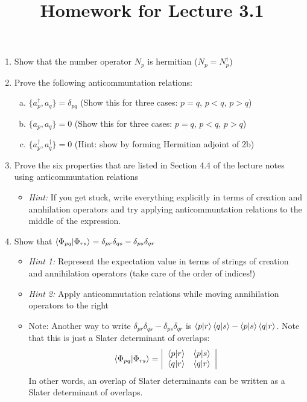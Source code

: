 \documentclass{article}
\title{Homework for Lecture 3.1 }
\date{}
\begin{document}
\maketitle
\noindent
\begin{enumerate}
\item Show that the number operator $N_p$ is hermitian ($N_p = N_p^\dagger$)
\item Prove the following anticommuntation relations:
\begin{enumerate}[(a)]
\item $\{a_p^\dagger, a_q\} = \delta_{pq}$ (Show this for three cases: $p = q$, $p < q$, $p > q$)
\item $\{a_p, a_q\} = 0$ (Show this for three cases: $p = q$, $p < q$, $p > q$)
\item $\{a_p^\dagger, a_q^\dagger\} = 0$ (Hint: show by forming Hermitian adjoint of 2b)
\end{enumerate}
\item Prove the six properties that are listed in Section 4.4 of the lecture notes using anticommuntation relations
\begin{itemize} 
\item \textit{Hint:} If you get stuck, write everything explicitly in terms of creation and annhilation operators and try applying anticommuntation relations to the middle of the expression.
\end{itemize}
\item Show that  $\braket{\Phi_{pq} | \Phi_{rs}} = \delta_{pr} \delta_{qs} - \delta_{ps} \delta_{qr}$
\begin{itemize} 
\item \textit{Hint 1:} Represent the expectation value in terms of strings of creation and annihilation operators (take care of the order of indices!)
\item \textit{Hint 2:} Apply anticommutation relations while moving annihilation operators to the right
\item Note: Another way to write $\delta_{pr} \delta_{qs} - \delta_{ps} \delta_{qr}$ is $\braket{p|r}\braket{q|s} - \braket{p|s}\braket{q|r}$. 
Note that this is just a Slater determinant of overlaps: 
\[
   \braket{\Phi_{pq} | \Phi_{rs}} =
  \left| {\begin{array}{cc}
   \braket{p|r} & \braket{p|s} \\
   \braket{q|r} & \braket{q|r} \\
  \end{array} } \right|
\]
In other words, an overlap of Slater determinants can be written as a Slater determinant of overlaps. 
\end{itemize}
\end{enumerate}
\end{document}
